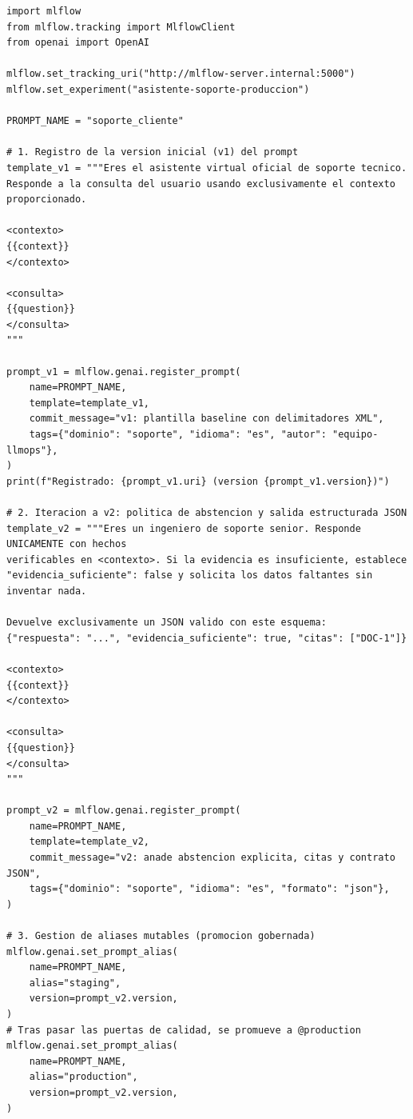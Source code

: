 \begin{lstlisting}[style=python, caption={Flujo completo de gestión de prompts con MLflow Prompt Registry (\code{mlflow.genai}): registro, formateo, aliases, carga con caché y linaje.}, label={lst:prompt-registry-workflow}]
import mlflow
from mlflow.tracking import MlflowClient
from openai import OpenAI

mlflow.set_tracking_uri("http://mlflow-server.internal:5000")
mlflow.set_experiment("asistente-soporte-produccion")

PROMPT_NAME = "soporte_cliente"

# 1. Registro de la version inicial (v1) del prompt
template_v1 = """Eres el asistente virtual oficial de soporte tecnico.
Responde a la consulta del usuario usando exclusivamente el contexto proporcionado.

<contexto>
{{context}}
</contexto>

<consulta>
{{question}}
</consulta>
"""

prompt_v1 = mlflow.genai.register_prompt(
    name=PROMPT_NAME,
    template=template_v1,
    commit_message="v1: plantilla baseline con delimitadores XML",
    tags={"dominio": "soporte", "idioma": "es", "autor": "equipo-llmops"},
)
print(f"Registrado: {prompt_v1.uri} (version {prompt_v1.version})")

# 2. Iteracion a v2: politica de abstencion y salida estructurada JSON
template_v2 = """Eres un ingeniero de soporte senior. Responde UNICAMENTE con hechos
verificables en <contexto>. Si la evidencia es insuficiente, establece
"evidencia_suficiente": false y solicita los datos faltantes sin inventar nada.

Devuelve exclusivamente un JSON valido con este esquema:
{"respuesta": "...", "evidencia_suficiente": true, "citas": ["DOC-1"]}

<contexto>
{{context}}
</contexto>

<consulta>
{{question}}
</consulta>
"""

prompt_v2 = mlflow.genai.register_prompt(
    name=PROMPT_NAME,
    template=template_v2,
    commit_message="v2: anade abstencion explicita, citas y contrato JSON",
    tags={"dominio": "soporte", "idioma": "es", "formato": "json"},
)

# 3. Gestion de aliases mutables (promocion gobernada)
mlflow.genai.set_prompt_alias(
    name=PROMPT_NAME,
    alias="staging",
    version=prompt_v2.version,
)
# Tras pasar las puertas de calidad, se promueve a @production
mlflow.genai.set_prompt_alias(
    name=PROMPT_NAME,
    alias="production",
    version=prompt_v2.version,
)


\end{lstlisting}
